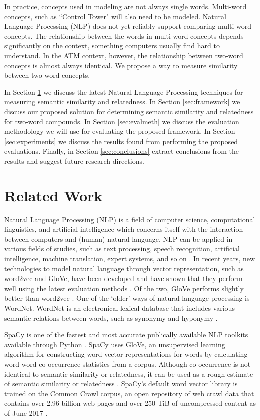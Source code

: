\documentclass{article}
\begin{document}
In practice, concepts used in modeling are not always single words. Multi-word concepts, such as ``Control Tower" will also need to be modeled. Natural Language Processing (NLP) does not yet reliably support comparing multi-word concepts. The relationship between the words in multi-word concepts depends significantly on the context, something computers usually find hard to understand. In the ATM context, however, the relationship between two-word concepts is almost always identical. We propose a way to measure similarity between two-word concepts.

In Section \ref{sec:relwork} we discuss the latest Natural Language Processing techniques for measuring semantic similarity and relatedness. In Section \ref{sec:framework} we discuss our proposed solution for determining semantic similarity and relatedness for two-word compounds. In Section \ref{sec:evalmeth} we discuss the evaluation methodology we will use for evaluating the proposed framework. In Section \ref{sec:experiments} we discuss the results found from performing the proposed evaluations. Finally, in Section \ref{sec:conclusions} extract conclusions from the results and suggest future research directions.

\section{Related Work} \label{sec:relwork}

Natural Language Processing (NLP) is a field of computer science, computational linguistics, and artificial intelligence which concerns itself with the interaction between computers and (human) natural language. NLP can be applied in various fields of studies, such as text processing, speech recognition, artificial intelligence, machine translation, expert systems, and so on \citep{chowdhury2003natural}. 
In recent years, new technologies to model natural language through vector representation, such as word2vec and GloVe, have been developed \citep{mikolov2013efficient, pennington2014glove} and have shown that they perform well using the latest evaluation methods \citep{schnabel2015evaluation}. Of the two, GloVe performs slightly better than word2vec \citep{lee2016combining}.
One of the `older' ways of natural language processing is WordNet. WordNet is an electronical lexical database that includes various semantic relations between words, such as synonymy and hyponymy \citep{kilgarriff2000wordnet}.

SpaCy is one of the fastest and most accurate publically available NLP toolkits available through Python \citep{choi2015depends}. SpaCy uses GloVe, an unsupervised learning algorithm for constructing word vector representations for words by calculating word-word co-occurrence statistics from a corpus. Although co-occurrence is not identical to semantic similarity or relatedness, it can be used as a rough estimate of semantic similarity or relatedness \citep{levy2015improving}. SpaCy's default word vector library is trained on the Common Crawl corpus, an open repository of web crawl data that contains over 2.96 billion web pages and over 250 TiB of uncompressed content as of June 2017 \citep{nagel2017commoncrawl}.
\end{document}
